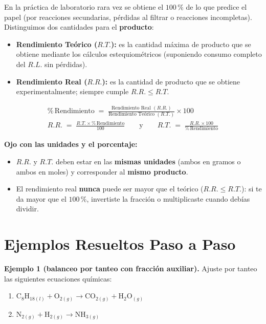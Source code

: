 \documentclass[12pt, letterpaper]{article}
\newcommand{\pc}{\text{\%}}
\begin{document}
\begin{cuadroteoria}[nobreak=true]
  En la práctica de laboratorio rara vez se obtiene el $100\,\pc$ de lo que predice el papel (por reacciones secundarias, pérdidas al filtrar o reacciones incompletas). Distinguimos dos cantidades para el \textbf{producto}:
  \begin{itemize}[leftmargin=*, nosep, topsep=3pt]
    \item \textbf{Rendimiento Teórico ($R.T.$):} es la cantidad máxima de producto que se obtiene mediante los cálculos estequiométricos (suponiendo consumo completo del $R.L.$ sin pérdidas).
    \item \textbf{Rendimiento Real ($R.R.$):} es la cantidad de producto que se obtiene experimentalmente; siempre cumple $R.R. \le R.T.$
  \end{itemize}
  \begin{gather*}
    \boxed{\pc\,\text{Rendimiento} \;=\; \frac{\text{Rendimiento Real }(R.R.)}{\text{Rendimiento Teórico }(R.T.)}\times 100} \\[4pt]
    \boxed{R.R. \;=\; \frac{R.T.\times \pc\,\text{Rendimiento}}{100}}
    \qquad\text{y}\qquad
    \boxed{R.T. \;=\; \frac{R.R.\times 100}{\pc\,\text{Rendimiento}}}
  \end{gather*}
\end{cuadroteoria}

\begin{cuadroadvertencia}[nobreak=true]
  \textbf{Ojo con las unidades y el porcentaje:}
  \begin{itemize}[leftmargin=*, nosep, topsep=2pt]
    \item $R.R.$ y $R.T.$ deben estar en las \textbf{mismas unidades} (ambos en gramos o ambos en moles) y corresponder al \textbf{mismo producto}.
    \item El rendimiento real \textbf{nunca} puede ser mayor que el teórico ($R.R. \le R.T.$): si te da mayor que el $100\,\pc$, invertiste la fracción o multiplicaste cuando debías dividir.
  \end{itemize}
\end{cuadroadvertencia}

\newpage
\section{Ejemplos Resueltos Paso a Paso}

\noindent\textbf{Ejemplo 1 (balanceo por tanteo con fracción auxiliar).} Ajuste por tanteo las siguientes ecuaciones químicas:
\begin{enumerate}[label=\alph*), leftmargin=1.8em, nosep, topsep=2pt]
  \item $\text{C}_8\text{H}_{18(l)} + \text{O}_{2(g)} \longrightarrow \text{CO}_{2(g)} + \text{H}_2\text{O}_{(g)}$
  \item $\text{N}_{2(g)} + \text{H}_{2(g)} \longrightarrow \text{NH}_{3(g)}$
\end{enumerate}
\end{document}
